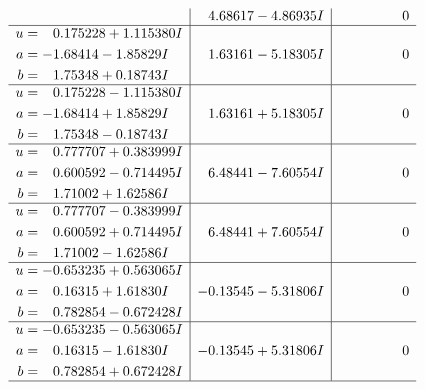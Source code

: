 \documentclass[1p]{elsarticle_modified}
\theoremstyle{definition}
\begin{document}
$$\begin{array}{c|c|c}
 & \phantom{-}4.68617 - 4.86935 I & \phantom{-0.000000 } 0 \\ \hline\begin{aligned}
u &= \phantom{-}0.175228 + 1.115380 I \\
a &= -1.68414 - 1.85829 I \\
b &= \phantom{-}1.75348 + 0.18743 I\end{aligned}
 & \phantom{-}1.63161 - 5.18305 I & \phantom{-0.000000 } 0 \\ \hline\begin{aligned}
u &= \phantom{-}0.175228 - 1.115380 I \\
a &= -1.68414 + 1.85829 I \\
b &= \phantom{-}1.75348 - 0.18743 I\end{aligned}
 & \phantom{-}1.63161 + 5.18305 I & \phantom{-0.000000 } 0 \\ \hline\begin{aligned}
u &= \phantom{-}0.777707 + 0.383999 I \\
a &= \phantom{-}0.600592 - 0.714495 I \\
b &= \phantom{-}1.71002 + 1.62586 I\end{aligned}
 & \phantom{-}6.48441 - 7.60554 I & \phantom{-0.000000 } 0 \\ \hline\begin{aligned}
u &= \phantom{-}0.777707 - 0.383999 I \\
a &= \phantom{-}0.600592 + 0.714495 I \\
b &= \phantom{-}1.71002 - 1.62586 I\end{aligned}
 & \phantom{-}6.48441 + 7.60554 I & \phantom{-0.000000 } 0 \\ \hline\begin{aligned}
u &= -0.653235 + 0.563065 I \\
a &= \phantom{-}0.16315 + 1.61830 I \\
b &= \phantom{-}0.782854 - 0.672428 I\end{aligned}
 & -0.13545 - 5.31806 I & \phantom{-0.000000 } 0 \\ \hline\begin{aligned}
u &= -0.653235 - 0.563065 I \\
a &= \phantom{-}0.16315 - 1.61830 I \\
b &= \phantom{-}0.782854 + 0.672428 I\end{aligned}
 & -0.13545 + 5.31806 I & \phantom{-0.000000 } 0\\
 \hline 
 \end{array}$$\newpage$$\begin{array}{c|c|c}  

\end{array}$$
\end{document}
